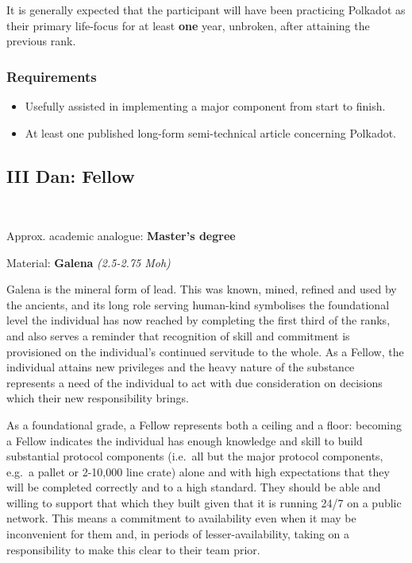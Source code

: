 \documentclass[9pt,oneside]{amsart}
\begin{document}
It is generally expected that the participant will have been practicing Polkadot as their primary life-focus for at least \textbf{one} year, unbroken, after attaining the previous rank.

\subsubsection{Requirements}\label{requirements-1}

\begin{itemize}
\item Usefully assisted in implementing a major component from start to finish.
\item At least one published long-form semi-technical article concerning Polkadot.
\end{itemize}

\subsection{III Dan: Fellow}\label{iii-dan-fellow}~\\


Approx. academic analogue: \textbf{Master's degree}

Material: \textbf{Galena} \emph{(2.5-2.75 Moh)}

Galena is the mineral form of lead. This was known, mined, refined and used by the ancients, and its long role serving human-kind symbolises the foundational level the individual has now reached by completing the first third of the ranks, and also serves a reminder that recognition of skill and commitment is provisioned on the individual's continued servitude to the whole. As a Fellow, the individual attains new privileges and the heavy nature of the substance represents a need of the individual to act with due consideration on decisions which their new responsibility brings.

As a foundational grade, a Fellow represents both a ceiling and a floor: becoming a Fellow indicates the individual has enough knowledge and skill to build substantial protocol components (i.e.~all but the major protocol components, e.g.~a pallet or 2-10,000 line crate) alone and with high expectations that they will be completed correctly and to a high standard. They should be able and willing to support that which they built given that it is running 24/7 on a public network. This means a commitment to availability even when it may be inconvenient for them and, in periods of lesser-availability, taking on a responsibility to make this clear to their team prior.
\end{document}
